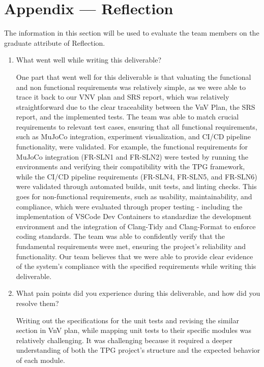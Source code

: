 \documentclass[12pt, titlepage]{article}
\begin{document}
\section*{Appendix --- Reflection}

The information in this section will be used to evaluate the team members on the
graduate attribute of Reflection.



\begin{enumerate}
  \item What went well while writing this deliverable? 

  One part that went well for this deliverable is that valuating the functional and non functional requirements was relatively simple, as we were able to trace it back to our VNV plan and SRS report, which was relatively straightforward due to the clear traceability between the VnV Plan, the SRS report, and the implemented tests. The team was able to match crucial requirements to relevant test cases, ensuring that all functional requirements, such as MuJoCo integration, experiment visualization, and CI/CD pipeline functionality, were validated. For example, the functional requirements for MuJoCo integration (FR-SLN1 and FR-SLN2) were tested by running the environments and verifying their compatibility with the TPG framework, while the CI/CD pipeline requirements (FR-SLN4, FR-SLN5, and FR-SLN6) were validated through automated builds, unit tests, and linting checks. This goes for non-functional requirements, such as usability, maintainability, and compliance, which were evaluated through proper testing - including the implementation of VSCode Dev Containers to standardize the development environment and the integration of Clang-Tidy and Clang-Format to enforce coding standards. The team was able to confidently verify that the fundamental requirements were met, ensuring the project's reliability and functionality. Our team believes that we were able to provide clear evidence of the system's compliance with the specified requirements while writing this deliverable.


  \item What pain points did you experience during this deliverable, and how
    did you resolve them?

    Writing out the specifications for the unit tests and revising the similar section in VnV plan, while mapping unit tests to their specific modules was relatively challenging. It was challenging because it required a deeper understanding of both the TPG project's structure and the expected behavior of each module. 


\end{enumerate}
\end{document}
